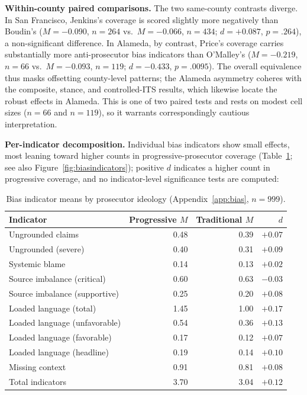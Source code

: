 \documentclass[12pt, letterpaper]{article}
\begin{document}
\begin{appendices}
\textbf{Within-county paired comparisons.} The two same-county contrasts diverge. In San Francisco, Jenkins's coverage is scored slightly more negatively than Boudin's ($M = -0.090$, $n = 264$ vs.\ $M = -0.066$, $n = 434$; $d = +0.087$, $p = .264$), a non-significant difference. In Alameda, by contrast, Price's coverage carries substantially more anti-prosecutor bias indicators than O'Malley's ($M = -0.219$, $n = 66$ vs.\ $M = -0.093$, $n = 119$; $d = -0.433$, $p = .0095$). The overall equivalence thus masks offsetting county-level patterns; the Alameda asymmetry coheres with the composite, stance, and controlled-ITS results, which likewise locate the robust effects in Alameda. This is one of two paired tests and rests on modest cell sizes ($n = 66$ and $n = 119$), so it warrants correspondingly cautious interpretation.

\textbf{Per-indicator decomposition.} Individual bias indicators show small effects, most leaning toward higher counts in progressive-prosecutor coverage (Table~\ref{tab:indicators}; see also Figure~\ref{fig:biasindicators}); positive $d$ indicates a higher count in progressive coverage, and no indicator-level significance tests are computed:

\begin{table}[ht]
\centering
\caption{Bias indicator means by prosecutor ideology (Appendix~\ref{app:bias}, $n = 999$).}
\label{tab:indicators}
\begin{tabular}{lrrr}
\toprule
Indicator & Progressive $M$ & Traditional $M$ & $d$ \\
\midrule
Ungrounded claims          & 0.48 & 0.39 & $+0.07$ \\
Ungrounded (severe)        & 0.40 & 0.31 & $+0.09$ \\
Systemic blame             & 0.14 & 0.13 & $+0.02$ \\
Source imbalance (critical) & 0.60 & 0.63 & $-0.03$ \\
Source imbalance (supportive) & 0.25 & 0.20 & $+0.08$ \\
Loaded language (total)    & 1.45 & 1.00 & $+0.17$ \\
Loaded language (unfavorable) & 0.54 & 0.36 & $+0.13$ \\
Loaded language (favorable) & 0.17 & 0.12 & $+0.07$ \\
Loaded language (headline) & 0.19 & 0.14 & $+0.10$ \\
Missing context            & 0.91 & 0.81 & $+0.08$ \\
Total indicators           & 3.70 & 3.04 & $+0.12$ \\
\bottomrule
\end{tabular}
\end{table}


\end{appendices}
\end{document}
